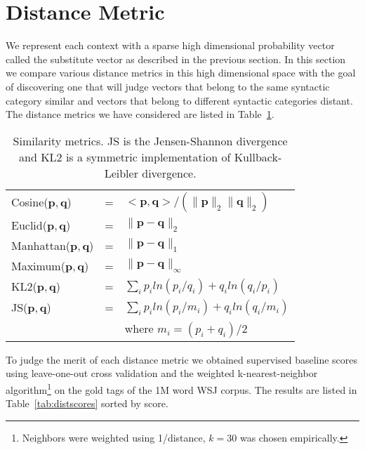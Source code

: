 \section{Distance Metric}
\label{sec:dist}

We represent each context with a sparse high dimensional probability
vector called the substitute vector as described in the previous
section.  In this section we compare various distance metrics in this
high dimensional space with the goal of discovering one that will
judge vectors that belong to the same syntactic category similar and
vectors that belong to different syntactic categories distant.  The
distance metrics we have considered are listed in
Table~\ref{tab:metrics}.


\begin{table}[ht] \centering
\small
\begin{tabular}{|lll|}
\hline
Cosine($\mathbf{p}, \mathbf{q}$) & = & $<\mathbf{p},\mathbf{q}> / (\|\mathbf{p}\|_{2} \|\mathbf{q}\|_{2})$ \\
Euclid($\mathbf{p}, \mathbf{q}$) & = & $\|\mathbf{p} - \mathbf{q}\|_{2}$ \\
Manhattan($\mathbf{p}, \mathbf{q}$) & = & $\|\mathbf{p} - \mathbf{q}\|_{1}$ \\
Maximum($\mathbf{p}, \mathbf{q}$) & = & $\|\mathbf{p} - \mathbf{q}\|_{\infty}$ \\
KL2($\mathbf{p}, \mathbf{q}$) & = & $\sum_i p_iln(p_i/q_i) + q_iln(q_i/p_i) $\\
JS($\mathbf{p}, \mathbf{q}$) & = & $\sum_i p_iln(p_i/m_i) + q_iln(q_i/m_i) $\\
& & where $m_i = (p_i + q_i) / 2$\\
\hline
\end{tabular}
\caption{Similarity metrics.  JS is the Jensen-Shannon divergence and
  KL2 is a symmetric implementation of Kullback-Leibler divergence.}
\label{tab:metrics}
\end{table}


To judge the merit of each distance metric we obtained supervised
baseline scores using leave-one-out cross validation and the weighted
k-nearest-neighbor algorithm\footnote{Neighbors were weighted using
  1/distance, $k=30$ was chosen empirically.} on the gold tags of the
1M word WSJ corpus.  The results are listed in
Table~\ref{tab:distscores} sorted by score.


